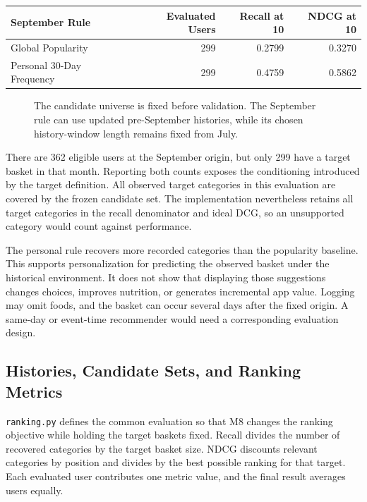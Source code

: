 \begin{table}[H]
\centering\small
\begin{tabular}{@{}lrrr@{}}
\toprule
September Rule & Evaluated Users & Recall at 10 & NDCG at 10 \\
\midrule

Global Popularity & 299 & 0.2799 & 0.3270 \\
Personal 30-Day Frequency & 299 & 0.4759 & 0.5862 \\
\bottomrule
\end{tabular}
\end{table}

\begin{figure}[htbp]
\centering

\caption{The candidate universe is fixed before validation. The September rule can use updated pre-September histories, while its chosen history-window length remains fixed from July.}\label{fig:M07_mhealth_timing}
\end{figure}

There are 362 eligible users at the September origin, but only 299 have
a target basket in that month. Reporting both counts exposes the
conditioning introduced by the target definition. All observed target
categories in this evaluation are covered by the frozen candidate set.
The implementation nevertheless retains all target categories in the
recall denominator and ideal DCG, so an unsupported category would count
against performance.

The personal rule recovers more recorded categories than the popularity
baseline. This supports personalization for predicting the observed
basket under the historical environment. It does not show that
displaying those suggestions changes choices, improves nutrition, or
generates incremental app value. Logging may omit foods, and the basket
can occur several days after the fixed origin. A same-day or event-time
recommender would need a corresponding evaluation design.

\hypertarget{M07-histories-candidate-sets-and-ranking-metrics}{%
\subsection{Histories, Candidate Sets, and Ranking
Metrics}\label{M07-histories-candidate-sets-and-ranking-metrics}}

\noindent \texttt{ranking.py} defines the common evaluation so that M8 changes the
ranking objective while holding the target baskets fixed. Recall divides
the number of recovered categories by the target basket size. NDCG
discounts relevant categories by position and divides by the best
possible ranking for that target. Each evaluated user contributes one
metric value, and the final result averages users equally.

